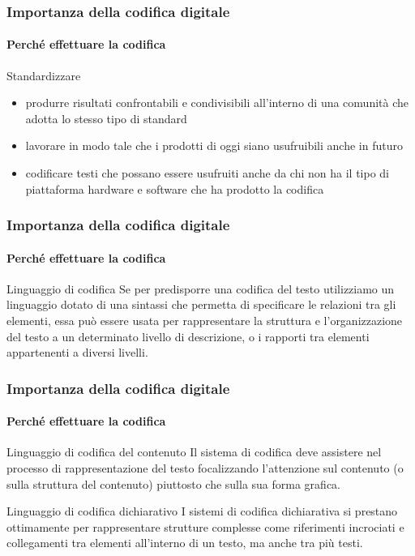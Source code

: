 \begin{frame}
	\frametitle{Importanza della codifica digitale}
	\framesubtitle{Perché effettuare la codifica}
	\addtocounter{nframe}{1}

	\begin{block}{Standardizzare}

		\begin{itemize}
			\item produrre risultati confrontabili e condivisibili all’interno di
			una comunità che adotta lo stesso tipo di standard
			\item lavorare in modo tale che i prodotti di oggi siano
			usufruibili anche in futuro
			\item codificare testi che possano essere usufruiti anche da chi
			non ha il tipo di piattaforma hardware e software che ha
			prodotto la codifica
		\end{itemize}
		 
	\end{block}

\end{frame}


\begin{frame}
	\frametitle{Importanza della codifica digitale}
	\framesubtitle{Perché effettuare la codifica}
	\addtocounter{nframe}{1}

	\begin{block}{Linguaggio di codifica}
		Se per predisporre una codifica del testo utilizziamo un linguaggio dotato di una sintassi che permetta di specificare le relazioni tra gli elementi, essa può essere usata per rappresentare la struttura e l’organizzazione del testo a un determinato livello di descrizione, o i rapporti tra elementi appartenenti a diversi livelli.
	\end{block}

\end{frame}

\begin{frame}
	\frametitle{Importanza della codifica digitale}
	\framesubtitle{Perché effettuare la codifica}
	\addtocounter{nframe}{1}

	\begin{block}{Linguaggio di codifica del contenuto}
		Il sistema di codifica deve assistere nel processo di rappresentazione del testo focalizzando l’attenzione sul contenuto (o sulla struttura del contenuto) piuttosto che sulla sua forma grafica.
	\end{block}

	\begin{block}{Linguaggio di codifica dichiarativo}
		I sistemi di codifica dichiarativa si prestano ottimamente per rappresentare strutture complesse come riferimenti incrociati e collegamenti tra elementi all’interno di un testo, ma anche tra più testi.
	\end{block}

\end{frame}

